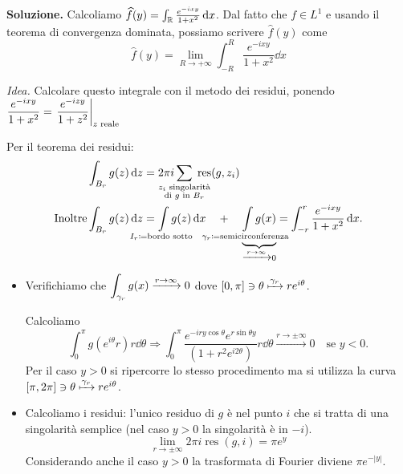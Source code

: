 \textbf{Soluzione.}
Calcoliamo $\widehat{f}(y) = \int_\mathbb R \frac{e^{-ixy}}{1 + x^2} \,\mathrm{d} x$.
Dal fatto che $f \in L^1$ e usando il teorema di convergenza dominata, possiamo scrivere $\hat{f}(y)$ come
%
$$
	\hat{f}(y) = \lim_{R \to +\infty} \int_{-R}^R \frac{e^{-ixy}}{1 + x^2} \dd x
$$
%

\begin{wrapfigure}{r}{0.4\textwidth}
	\centering
	\vspace{-1cm}
	\vspace{-5cm}
\end{wrapfigure}



\textit{Idea.} Calcolare questo integrale con il metodo dei residui, ponendo $\displaystyle \frac{e^{-ixy}}{1 + x^2} = \left. \frac{e^{-izy}}{1 + z^2} \right|_{z \text{ reale}}$

Per il teorema dei residui:
\begin{align*}
	& \int_{B_r} g(z) \dd z = 2\pi i \sum_{\mathclap{\substack{z_i \text{ singolarità} \\ \text{di } g \text{ in } B_r}}} \; \operatorname{res} (g,z_i) \\
	\text{Inoltre} &
	\int_{B_r} g(z) \dd z = \int\limits_{\mathclap{I_r \coloneqq \text{bordo  sotto}}} g(z) \dd x \quad 
	+ \quad \underbrace{\int\limits_{\mathclap{\gamma_r \coloneqq \text{semicirconferenza}}} g(x)}_{\xrightarrow{r \to \infty} 0}
	= \int_{-r}^{r} \frac{e^{-ixy}}{1 + x^2} \dd x.
\end{align*}

\begin{itemize}

	\item Verifichiamo che $\displaystyle \int_{\gamma_r} g(x) \xrightarrow{r \to \infty} 0$ dove $[0,\pi] \ni \theta \xmapsto{\gamma_r} r e^{i\theta}$.

	Calcoliamo
	$$
		\int_0^\pi g(e^{i\theta}r) r \dd \theta
		\Longrightarrow \int_0^\pi \frac{e^{-iry\cos \theta} e^{r \sin\theta y}}{(1 + r^2 e^{i2\theta})} r \dd \theta
		\xrightarrow{r \to \pm \infty} 0 \quad \text{se } y < 0. 
	$$
	Per il caso $y > 0$ si ripercorre lo stesso procedimento ma si utilizza la curva $[\pi,2\pi] \ni \theta \xmapsto{\gamma_r} r e^{i\theta}$.


	\item Calcoliamo i residui: l'unico residuo di $g$ è nel punto $i$ che si tratta di una singolarità semplice (nel caso $y > 0$ la singolarità è in $-i$).
	$$
		\lim_{r \to \pm \infty} 2\pi i \operatorname{res}(g,i) = \pi e^{y}
	$$
	Considerando anche il caso $y > 0$ la trasformata di Fourier diviene $\pi e^{-|y|}$.

\end{itemize}
